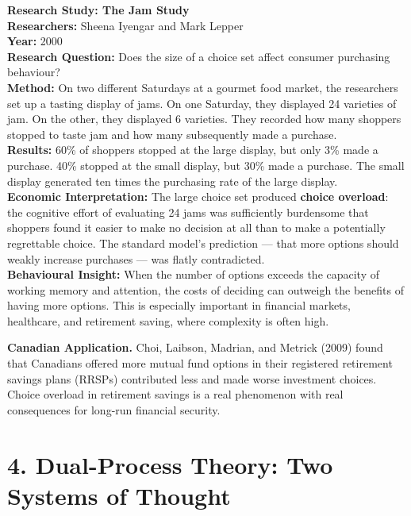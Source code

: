 \documentclass[12pt, letterpaper]{article}
\begin{document}
\begin{researchbox}
\textbf{Research Study: The Jam Study}\\[4pt]

\textbf{Researchers:} Sheena Iyengar and Mark Lepper\\[4pt]
\textbf{Year:} 2000\\[4pt]
\textbf{Research Question:} Does the size of a choice set affect consumer purchasing behaviour?\\[4pt]
\textbf{Method:} On two different Saturdays at a gourmet food market, the researchers set up a tasting display of jams. On one Saturday, they displayed 24 varieties of jam. On the other, they displayed 6 varieties. They recorded how many shoppers stopped to taste jam and how many subsequently made a purchase.\\[4pt]
\textbf{Results:} 60\% of shoppers stopped at the large display, but only 3\% made a purchase. 40\% stopped at the small display, but 30\% made a purchase. The small display generated ten times the purchasing rate of the large display.\\[4pt]
\textbf{Economic Interpretation:} The large choice set produced \textbf{choice overload}: the cognitive effort of evaluating 24 jams was sufficiently burdensome that shoppers found it easier to make no decision at all than to make a potentially regrettable choice. The standard model's prediction --- that more options should weakly increase purchases --- was flatly contradicted.\\[4pt]
\textbf{Behavioural Insight:} When the number of options exceeds the capacity of working memory and attention, the costs of deciding can outweigh the benefits of having more options. This is especially important in financial markets, healthcare, and retirement saving, where complexity is often high.\\[4pt]
\end{researchbox}

\textbf{Canadian Application.} Choi, Laibson, Madrian, and Metrick (2009) found that Canadians offered more mutual fund options in their registered retirement savings plans (RRSPs) contributed less and made worse investment choices. Choice overload in retirement savings is a real phenomenon with real consequences for long-run financial security.

\medskip


\section{4. Dual-Process Theory: Two Systems of Thought}
\end{document}
